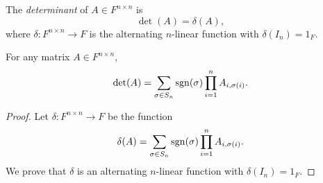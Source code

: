 \begin{definition}
  The \emph{determinant} of $A \in F^{n \times n}$ is
  \begin{equation*}
    \det(A) = \delta(A),
  \end{equation*}
  where $\delta: F^{n \times n} \to F$ is the alternating $n$-linear function
  with $\delta(I_n) = 1_F$.
\end{definition}

\begin{theorem}
  \label{thm:determinant-permutation}
  For any matrix $A \in F^{n \times n}$,
  \begin{equation*}
    \det(A)
    = \sum_{\sigma \in S_n} \operatorname{sgn}(\sigma) \prod_{i=1}^n A_{i, \sigma(i)}.
  \end{equation*}
\end{theorem}
\begin{proof}
  Let $\delta: F^{n \times n} \to F$ be the function
  \begin{equation*}
    \delta(A)
    = \sum_{\sigma \in S_n} \operatorname{sgn}(\sigma) \prod_{i=1}^n A_{i, \sigma(i)}.
  \end{equation*}
  We prove that $\delta$ is an alternating $n$-linear function with
  $\delta(I_n) = 1_F$.


\end{proof}
